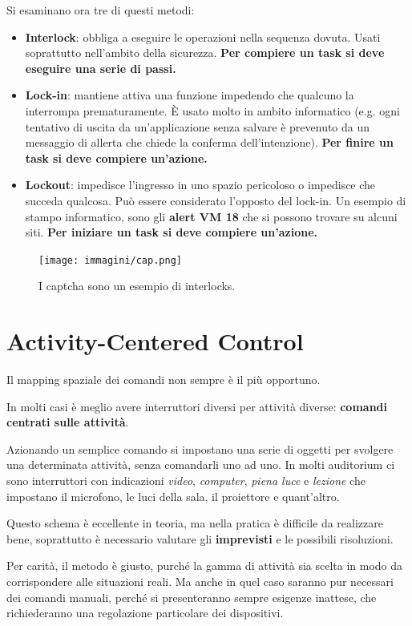 Si esaminano ora tre di questi metodi:
\begin{itemize}
	\item \textbf{Interlock}: obbliga a eseguire le operazioni nella sequenza dovuta. Usati soprattutto nell'ambito della sicurezza. \textbf{Per compiere un task si deve eseguire una serie di passi.}
	\item \textbf{Lock-in}: mantiene attiva una funzione impedendo che qualcuno la interrompa prematuramente. È usato molto in ambito informatico (e.g. ogni tentativo di uscita da un'applicazione senza salvare è prevenuto da un messaggio di allerta che chiede la conferma dell'intenzione). \textbf{Per finire un task si deve compiere un'azione.}
	\item \textbf{Lockout}: impedisce l'ingresso in uno spazio pericoloso o impedisce che succeda qualcosa. Può essere considerato l'opposto del lock-in. Un esempio di stampo informatico, sono gli \textbf{alert VM 18} che si possono trovare su alcuni siti. \textbf{Per iniziare un task si deve compiere un'azione.}
\end{itemize}

\begin{figure}[!h]
	\centering
	\texttt{[image: immagini/cap.png]}
	\caption{I captcha sono un esempio di interlocks.}
\end{figure}

\section{Activity-Centered Control}
Il mapping spaziale dei comandi non sempre è il più opportuno.

In molti casi è meglio avere interruttori diversi per attività diverse: \textbf{comandi centrati sulle attività}.

Azionando un semplice comando si impostano una serie di oggetti per svolgere una determinata attività, senza comandarli uno ad uno. In molti auditorium ci sono interruttori con indicazioni \textit{video}, \textit{computer}, \textit{piena luce} e \textit{lezione} che impostano il microfono, le luci della sala, il proiettore e quant'altro.

Questo schema è eccellente in teoria, ma nella pratica è difficile da realizzare bene, soprattutto è necessario valutare gli \textbf{imprevisti} e le possibili risoluzioni.

Per carità, il metodo è giusto, purché la gamma di attività sia scelta in modo da corrispondere alle situazioni reali. Ma anche in quel caso saranno pur necessari dei comandi manuali, perché si presenteranno sempre esigenze inattese, che richiederanno una regolazione particolare dei dispositivi.
